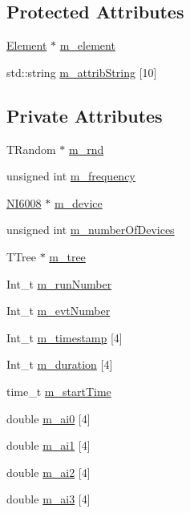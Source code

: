 \subsection*{Protected Attributes}
\begin{DoxyCompactItemize}
\item 
\hyperlink{classElement}{Element} $\ast$ \hyperlink{classProcessus_aa9d24d53c3e52f36786cabb5d8e296e7}{m\_\-element}
\item 
std::string \hyperlink{classAttrib_a3414521d7a82476e874b25a5407b5e63}{m\_\-attribString} \mbox{[}10\mbox{]}
\end{DoxyCompactItemize}
\subsection*{Private Attributes}
\begin{DoxyCompactItemize}
\item 
TRandom $\ast$ \hyperlink{classCurrentMeasurement_ac0c595b78b8110a19b59a333a6c27c1b}{m\_\-rnd}
\item 
unsigned int \hyperlink{classCurrentMeasurement_a66e12903825632c0434e3b7cf929a960}{m\_\-frequency}
\item 
\hyperlink{classNI6008}{NI6008} $\ast$ \hyperlink{classCurrentMeasurement_a7df157175089da57bd020b8680e87f80}{m\_\-device}
\item 
unsigned int \hyperlink{classCurrentMeasurement_a073f6aba41750712d620e60e346f2315}{m\_\-numberOfDevices}
\item 
TTree $\ast$ \hyperlink{classCurrentMeasurement_a559823413932b393dedfc62d42268d93}{m\_\-tree}
\item 
Int\_\-t \hyperlink{classCurrentMeasurement_a5a7bfe59821148e4e9e2998c73b635a8}{m\_\-runNumber}
\item 
Int\_\-t \hyperlink{classCurrentMeasurement_a6e01f96c84aec986de9a9f7393ccb2c6}{m\_\-evtNumber}
\item 
Int\_\-t \hyperlink{classCurrentMeasurement_acc9f2cabf165e47a9fbf2a357e424cef}{m\_\-timestamp} \mbox{[}4\mbox{]}
\item 
Int\_\-t \hyperlink{classCurrentMeasurement_ad08307f13d37c05e1a4e42ff39c97911}{m\_\-duration} \mbox{[}4\mbox{]}
\item 
time\_\-t \hyperlink{classCurrentMeasurement_abd5a7612f08721143623add96797a433}{m\_\-startTime}
\item 
double \hyperlink{classCurrentMeasurement_a793b1467b6a5388361340d41f9e8833f}{m\_\-ai0} \mbox{[}4\mbox{]}
\item 
double \hyperlink{classCurrentMeasurement_aeef18708be94b89de9c4384dd452207d}{m\_\-ai1} \mbox{[}4\mbox{]}
\item 
double \hyperlink{classCurrentMeasurement_a27ce0cfd8d1c04f6cd4d8de0403fafba}{m\_\-ai2} \mbox{[}4\mbox{]}
\item 
double \hyperlink{classCurrentMeasurement_aa1223e4b36335ceb507edd12d4cfa8ad}{m\_\-ai3} \mbox{[}4\mbox{]}
\end{DoxyCompactItemize}


